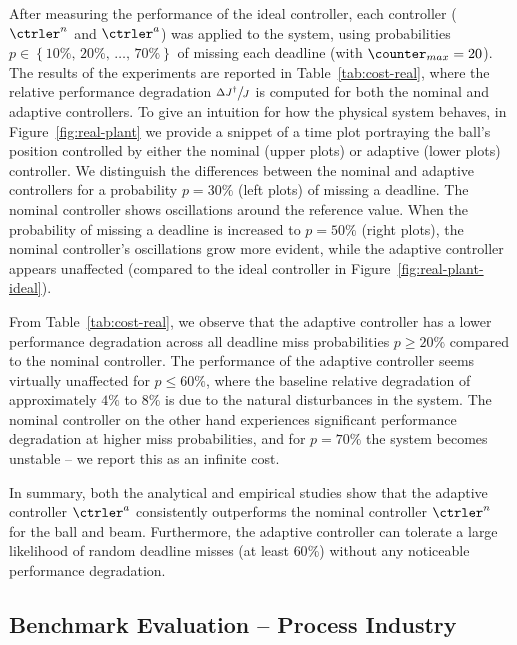 After measuring the performance of the ideal controller, each controller ($\ctrler^n$ and $\ctrler^a$) was applied to the system, using probabilities $p \in \left\{ 10\%,\, 20\%,\, \ldots,\, 70\% \right\}$ of missing each deadline (with $\counter_{max} = 20$).
The results of the experiments are reported in Table~\ref{tab:cost-real}, where the relative performance degradation $\sfrac{\Delta J^\dagger}{J}$ is computed for both the nominal and adaptive controllers.
To give an intuition for how the physical system behaves, in Figure~\ref{fig:real-plant} we provide a snippet of a time plot portraying the ball's position controlled by either the nominal (upper plots) or adaptive (lower plots) controller.
We distinguish the differences between the nominal and adaptive controllers for a probability $p = 30\%$ (left plots) of missing a deadline.
The nominal controller shows oscillations around the reference value.
When the probability of missing a deadline is increased to $p = 50\%$ (right plots), the nominal controller's oscillations grow more evident, while the adaptive controller appears unaffected (compared to the ideal controller in Figure~\ref{fig:real-plant-ideal}).

From Table~\ref{tab:cost-real}, we observe that the adaptive controller has a lower performance degradation across all deadline miss probabilities $p \geq 20\%$ compared to the nominal controller.
The performance of the adaptive controller seems virtually unaffected for $p \leq 60\%$, where the baseline relative degradation of approximately  $4\%$ to $8\%$ is due to the natural disturbances in the system.
The nominal controller on the other hand experiences significant performance degradation at higher miss probabilities, and for $p = 70\%$ the system becomes unstable -- we report this as an infinite cost.

In summary, both the analytical and empirical studies show that the adaptive controller $\ctrler^a$ consistently outperforms the nominal controller $\ctrler^n$ for the ball and beam. Furthermore, the adaptive controller can tolerate
a large likelihood of random deadline misses (at least $60\%$) without any noticeable performance degradation.

\subsection{Benchmark Evaluation -- Process Industry}
\label{sec:aggregate}
%
